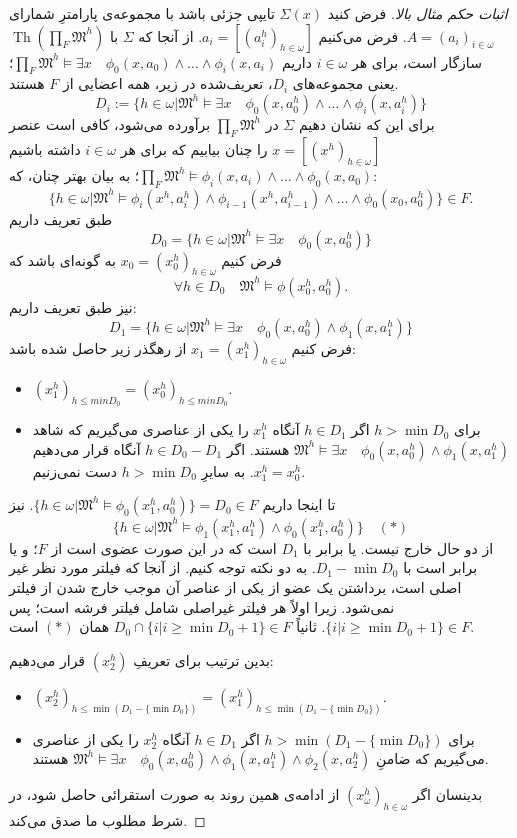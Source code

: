 \documentclass[12pt,a4paper]{report}
\theoremstyle{colorhead}
\DeclareMathOperator{\Th}{Th}
\begin{document}
 \begin{proof}[اثبات حکم مثال بالا]
 فرض کنید
 $\Sigma(x)$
 تایپی جزئی باشد با مجموعه‌ی پارامترِ شمارای
\mbox{$A=(a_i)_{i\in \omega}$}.
 فرض می‌کنیم
 $a_i=[(a_i^h)_{h\in \omega}]$.
 از آنجا که 
 $\Sigma$
 با
 $\Th(\prod_F \mathfrak{M}^h)$
 سازگار است، برای هر
 $i\in \omega$
 داریم
 $\prod_F \mathfrak{M}^h\models \exists x \quad \phi_0(x,a_0)\wedge \ldots\wedge \phi_i(x,a_i)$؛ 
 یعنی
مجموعه‌های
$D_i$،
تعریف‌شده در زیر، همه‌ اعضایی از
$F$
هستند.
 \[
 D_i:=\{h\in \omega| \mathfrak{M}^h\models \exists x\quad  \phi_0(x,a_0^h)\wedge \ldots \wedge \phi_i(x,a_i^h)\}
 \]
 برای این که نشان دهیم
 $\Sigma$
 در 
 $\prod_F \mathfrak{M}^h$
 برآورده می‌شود، کافی است عنصر
 $x=[(x^h)_{h\in \omega}]$
 را چنان بیابیم که برای هر
 $i\in \omega$
داشته باشیم
$\prod_F \mathfrak{M}^h\models \phi_i(x,a_i)\wedge \ldots\wedge\phi_0(x,a_0)$؛
به بیان بهتر چنان، که:
\[\{h\in \omega|\mathfrak{M}^h\models \phi_i(x^h,a_i^h)\wedge \phi_{i-1}(x^h,a_{i-1}^h)\wedge\ldots \wedge\phi_0(x_0,a_0^h)\}\in F.\]
طبق تعریف داریم
\[
D_0=
 \{h\in \omega| \mathfrak{M}^h\models \exists x\quad  \phi_0(x,a_0^h)\}
\] 
فرض کنیم
$x_0=(x_0^h)_{h\in \omega}$
 به گونه‌ای باشد که 
\[\forall h\in D_0\quad \mathfrak{M}^h\models \phi(x_0^h,a_0^h).\]
نیز طبق تعریف داریم:
\[
D_1=
 \{h\in \omega| \mathfrak{M}^h\models \exists x\quad  \phi_0(x,a_0^h)\wedge \phi_1(x,a_1^h)\}
 \]
  فرض کنیم
  $x_1=(x_1^h)_{h\in \omega}$
  از رهگذر زیر حاصل شده باشد:
  \begin{itemize}
  \item 
  $(x_1^h)_{h\leq min D_0}=(x_0^h)_{h\leq min D_0}$.
  \item 
  برای 
  $h>\min D_0$
  اگر
  $h\in D_1$
  آنگاه
  $x_1^h$
  را یکی از عناصری می‌گیریم که شاهد
 \mbox{$\mathfrak{M}^h\models \exists x\quad \phi_0(x,a_0^h)\wedge \phi_1(x,a_1^h)$}
  هستند. اگر
  $h\in D_0-D_1$
  آنگاه
  قرار می‌دهیم
  $x_1^h=x_0^h$.
  به سایرِ
  $h>\min D_0$
  دست نمی‌زنیم.
  \end{itemize}
تا اینجا داریم
$\{h\in \omega |\mathfrak{M}^h\models \phi_0(x_1^h,a_0^h)\}=D_0\in F$.
نیز 
\[\{h\in \omega |\mathfrak{M}^h\models \phi_1(x_1^h,a_1^h)\wedge \phi_0(x_1^h,a_0^h)\}\quad (*)\]
از دو حال خارج نیست. یا برابر با
$D_1$
است که در این صورت عضوی است از
$F$؛
و یا برابر است با
$D_1-\min D_0$.
به دو نکته توجه کنیم. از آنجا که فیلتر مورد نظر غیر اصلی است، برداشتن یک عضو از یکی از 
عناصر آن موجب خارج شدن از فیلتر نمی‌شود. زیرا
اولاً هر فیلتر غیراصلی شامل فیلتر فرشه است؛ پس
$\{i|i\geq \min D_0+1\}\in F$.
ثانیاً
$D_0\cap \{i|i\geq \min D_0+1\}\in F$
همان 
$(*)$
است.
\par 
بدین ترتیب برای تعریفِ
$(x_2^h)$
قرار می‌دهیم:
 \begin{itemize}
  \item 
  $(x_2^h)_{h\leq \min(D_1-\{\min D_0\})}=(x_1^h)_{h\leq \min (D_1-\{\min D_0\})}$.
  \item 
  برای 
  $h> \min(D_1-\{\min D_0\})$
  اگر
  $h\in D_1$
  آنگاه
  $x_2^h$
  را یکی از عناصری می‌گیریم که ضامنِ
  $\mathfrak{M}^h\models \exists x\quad \phi_0(x,a_0^h)\wedge \phi_1(x,a_1^h)\wedge\phi_2(x,a_2^h)$
  هستند. 
  \end{itemize}
  بدینسان اگر
  $(x_\omega^h)_{h\in \omega}$
  از ادامه‌ی همین روند به صورت استقرائی حاصل شود، در شرط مطلوب ما صدق می‌کند. 
  \end{proof}
\end{document}
